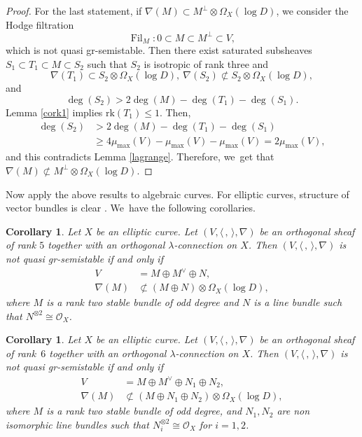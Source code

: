 \documentclass[JEP,XML,SOM,Unicode,published]{cedram}
\newcommand{\lconnection}{$\lambda$\nobreakdash-con\-nec\-tion\xspace}
\newcommand{\grsemistable}{gr\nobreakdash-semi\-stable\xspace}
\DeclareMathOperator{\Filt}{Fil}
\newcommand{\rk}{\mathrm{rk}}
\theoremstyle{plain}
\newtheorem{cor}[thm]{Corollary}
\theoremstyle{definition}
\begin{document}
\begin{proof}
For the last statement, if $ \nabla(M)\subset M^\perp\otimes\Omega_X(\log D)$, we consider the Hodge filtration
\[
\Filt_{M}:0\subset M\subset M^\perp\subset V,
\]
which is not quasi \grsemistable. Then there exist saturated subsheaves $S_1\subset T_1\subset M\subset S_2$ such that $S_2$ is isotropic of rank three and
\[
\nabla(T_1)\subset S_2\otimes\Omega_X(\log D),\ \nabla(S_2)\not\subset S_2\otimes\Omega_X(\log D),
\]
and
\[
\deg(S_2)>2\deg(M)-\deg(T_1)-\deg(S_1).
\]
Lemma \ref{cork1} implies $\rk(T_1)\leq1$. Then,
\begin{align*}
\deg(S_2) & >2\deg(M)-\deg(T_1)-\deg(S_1) \\
& \geq 4\mu_{\max}(V)-\mu_{\max}(V)-\mu_{\max}(V)=2\mu_{\max}(V),
\end{align*}
and this contradicts Lemma \ref{lagrange}. Therefore, we~get that $ \nabla(M)\not\subset M^\perp\otimes\Omega_X(\log D)$.
\end{proof}

Now apply the above results to algebraic curves. For elliptic curves, structure of vector bundles is clear \cite{A57,T93}. We~have the following corollaries.

\begin{cor}
Let $X$ be an elliptic curve. Let $(V,\langle \,, \, \rangle,\nabla)$ be an orthogonal sheaf of rank $5$ together with an orthogonal \lconnection on $X$. Then $(V,\langle \,, \, \rangle,\nabla)$ is not quasi \grsemistable if and only if
\begin{align*}
V&=M\oplus M^\vee\oplus N,
\\
\nabla(M)&\not\subset (M\oplus N)\otimes\Omega_X(\log D),
\end{align*}
where $M$ is a rank two stable bundle of odd degree and $N$ is a line bundle such that $N^{\otimes 2}\cong \mathcal{O}_X$.
\end{cor}

\begin{cor}\label{elliptic6}
Let $X$ be an elliptic curve. Let $(V,\langle \,, \, \rangle,\nabla)$ be an orthogonal sheaf of rank~$6$ together with an orthogonal \lconnection on $X$. Then $(V,\langle \,, \, \rangle,\nabla)$ is not quasi \grsemistable if and only if
\begin{align*}
V&=M\oplus M^\vee\oplus N_1\oplus N_2,
\\
\nabla(M)&\not\subset (M\oplus N_1\oplus N_2)\otimes\Omega_X(\log D),
\end{align*}
where $M$ is a rank two stable bundle of odd degree, and $N_1,N_2$ are non isomorphic line bundles such that $N_i^{\otimes 2}\cong \mathcal{O}_X$ for $i=1,2$.
\end{cor}
\end{document}
